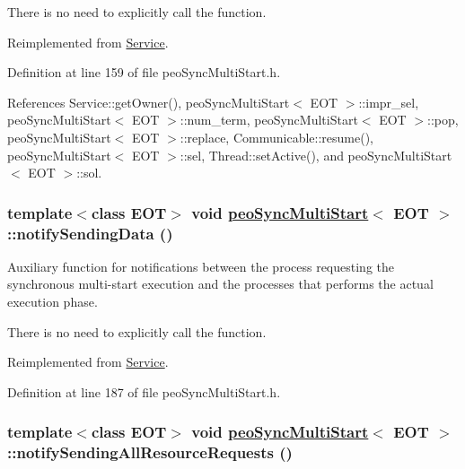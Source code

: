 There is no need to explicitly call the function. 

Reimplemented from \hyperlink{classService_45c06344edbfa482b91f68e2035a6099}{Service}.

Definition at line 159 of file peo\-Sync\-Multi\-Start.h.

References Service::get\-Owner(), peo\-Sync\-Multi\-Start$<$ EOT $>$::impr\_\-sel, peo\-Sync\-Multi\-Start$<$ EOT $>$::num\_\-term, peo\-Sync\-Multi\-Start$<$ EOT $>$::pop, peo\-Sync\-Multi\-Start$<$ EOT $>$::replace, Communicable::resume(), peo\-Sync\-Multi\-Start$<$ EOT $>$::sel, Thread::set\-Active(), and peo\-Sync\-Multi\-Start$<$ EOT $>$::sol.\hypertarget{classpeoSyncMultiStart_32ec0d01d3fd8a9932abd68f4781fc94}{
\subsubsection[notifySendingData]{\setlength{\rightskip}{0pt plus 5cm}template$<$class EOT$>$ void \hyperlink{classpeoSyncMultiStart}{peo\-Sync\-Multi\-Start}$<$ EOT $>$::notify\-Sending\-Data ()}}
\label{classpeoSyncMultiStart_32ec0d01d3fd8a9932abd68f4781fc94}


Auxiliary function for notifications between the process requesting the synchronous multi-start execution and the processes that performs the actual execution phase. 

There is no need to explicitly call the function. 

Reimplemented from \hyperlink{classService_81ad4d6ebb50045b8977e2ab74826f30}{Service}.

Definition at line 187 of file peo\-Sync\-Multi\-Start.h.\hypertarget{classpeoSyncMultiStart_fc90282cc4e93cdea8f82fd52dd78fb0}{
\subsubsection[notifySendingAllResourceRequests]{\setlength{\rightskip}{0pt plus 5cm}template$<$class EOT$>$ void \hyperlink{classpeoSyncMultiStart}{peo\-Sync\-Multi\-Start}$<$ EOT $>$::notify\-Sending\-All\-Resource\-Requests ()}}
\label{classpeoSyncMultiStart_fc90282cc4e93cdea8f82fd52dd78fb0}


